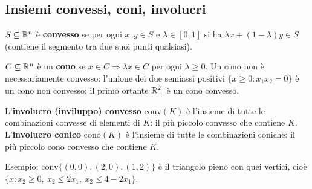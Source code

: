 \subsection{Insiemi convessi, coni, involucri}
\begin{defbox}
$S\subseteq\mathbb{R}^n$ è \textbf{convesso} se per ogni $x,y\in S$ e $\lambda\in[0,1]$ si ha $\lambda x+(1-\lambda)y\in S$ (contiene il segmento tra due suoi punti qualsiasi).
\end{defbox}
\begin{defbox}[cono]
$C\subseteq\mathbb{R}^n$ è un \textbf{cono} se $x\in C\Rightarrow \lambda x\in C$ per ogni $\lambda\ge0$. Un cono non è necessariamente convesso: l'unione dei due semiassi positivi $\{x\ge0: x_1x_2=0\}$ è un cono non convesso; il primo ortante $\mathbb{R}^2_+$ è un cono convesso.
\end{defbox}
\begin{defbox}
L'\textbf{involucro (inviluppo) convesso} $\mathrm{conv}(K)$ è l'insieme di tutte le combinazioni convesse di elementi di $K$: il più piccolo convesso che contiene $K$. L'\textbf{involucro conico} $\mathrm{cono}(K)$ è l'insieme di tutte le combinazioni coniche: il più piccolo cono convesso che contiene $K$.
\end{defbox}
Esempio: $\mathrm{conv}\{(0,0),(2,0),(1,2)\}$ è il triangolo pieno con quei vertici, cioè $\{x: x_2\ge0,\ x_2\le2x_1,\ x_2\le4-2x_1\}$.

